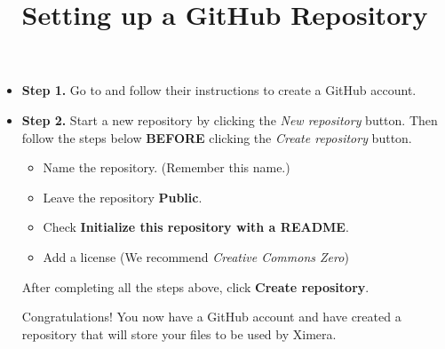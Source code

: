 \documentclass{ximera}
\title{Setting up a GitHub Repository}
\begin{document}

\maketitle


\begin{itemize}

\item\textbf{Step 1.} Go to  and follow their instructions to create a GitHub account. 

\item\textbf{Step 2.} Start a new repository by clicking the \emph{New repository} button. 
Then follow the steps below \textbf{BEFORE} clicking the \emph{Create repository} button.

\begin{itemize}

\item Name the repository. (Remember this name.)
\item Leave the repository \textbf{Public}.
\item Check \textbf{Initialize this repository with a README}.
\item Add a license (We recommend \emph{Creative Commons Zero})

\end{itemize}

After completing all the steps above, click \textbf{Create repository}.

Congratulations! You now have a GitHub account and have created a repository that will store your files to be used by Ximera.

\end{itemize}
\end{document}
